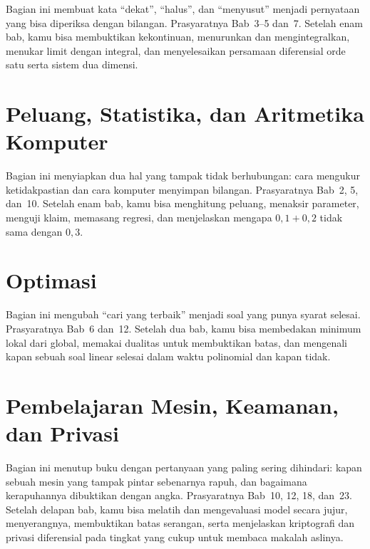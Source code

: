 \documentclass[11pt,a4paper,oneside]{book}
\theoremstyle{definition}
\theoremstyle{plain}
\theoremstyle{remark}
\begin{document}
Bagian ini membuat kata ``dekat'', ``halus'', dan ``menyusut'' menjadi pernyataan
yang bisa diperiksa dengan bilangan. Prasyaratnya Bab~3--5 dan~7. Setelah enam bab,
kamu bisa membuktikan kekontinuan, menurunkan dan mengintegralkan, menukar limit
dengan integral, dan menyelesaikan persamaan diferensial orde satu serta sistem
dua dimensi.







\part{Peluang, Statistika, dan Aritmetika Komputer}

Bagian ini menyiapkan dua hal yang tampak tidak berhubungan: cara mengukur
ketidakpastian dan cara komputer menyimpan bilangan. Prasyaratnya Bab~2, 5, dan~10.
Setelah enam bab, kamu bisa menghitung peluang, menaksir parameter, menguji klaim,
memasang regresi, dan menjelaskan mengapa $0{,}1+0{,}2$ tidak sama dengan $0{,}3$.







\part{Optimasi}

Bagian ini mengubah ``cari yang terbaik'' menjadi soal yang punya syarat
selesai. Prasyaratnya Bab~6 dan~12. Setelah dua bab, kamu bisa membedakan minimum
lokal dari global, memakai dualitas untuk membuktikan batas, dan mengenali kapan
sebuah soal linear selesai dalam waktu polinomial dan kapan tidak.



\part{Pembelajaran Mesin, Keamanan, dan Privasi}

Bagian ini menutup buku dengan pertanyaan yang paling sering dihindari: kapan
sebuah mesin yang tampak pintar sebenarnya rapuh, dan bagaimana kerapuhannya
dibuktikan dengan angka. Prasyaratnya Bab~10, 12, 18, dan~23. Setelah delapan bab,
kamu bisa melatih dan mengevaluasi model secara jujur, menyerangnya, membuktikan
batas serangan, serta menjelaskan kriptografi dan privasi diferensial pada tingkat
yang cukup untuk membaca makalah aslinya.









\appendix
\renewcommand{\appendixname}{Lampiran}
\end{document}
